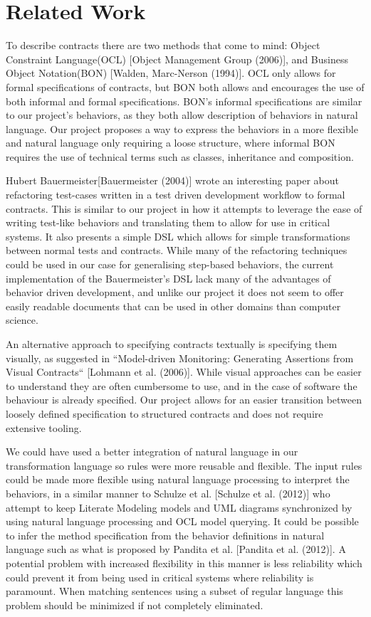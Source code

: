 \section{Related Work}
To describe contracts there are two methods that come to mind: Object Constraint Language(OCL) [Object Management Group (2006)], and Business Object Notation(BON) [Walden, Marc-Nerson (1994)].
OCL only allows for formal specifications of contracts, but BON both allows and encourages the use of both informal and formal specifications.
BON's informal specifications are similar to our project's behaviors, as they both allow description of behaviors in natural language.
Our project proposes a way to express the behaviors in a more flexible and natural language only requiring a loose structure, where informal BON requires the use of technical terms such as classes, inheritance and composition.



Hubert Bauermeister[Bauermeister (2004)] wrote an interesting paper about refactoring test-cases written in a test driven development workflow to formal contracts.
This is similar to our project in how it attempts to leverage the ease of writing test-like behaviors and translating them to allow for use in critical systems.
It also presents a simple DSL which allows for simple transformations between normal tests and contracts.
While many of the refactoring techniques could be used in our case for generalising step-based behaviors, the current implementation of the Bauermeister’s DSL lack many of the advantages of behavior driven development, and unlike our project it does not seem to offer easily readable documents that can be used in other domains than computer science.



An alternative approach to specifying contracts textually is specifying them visually, as suggested in “Model-driven Monitoring: Generating Assertions from Visual Contracts“ [Lohmann et al. (2006)]. While visual approaches can be easier to understand they are often cumbersome to use, and in the case of software the behaviour is already specified.
Our project allows for an easier transition between loosely defined specification to structured contracts and does not require extensive tooling.



We could have used a better integration of natural language in our transformation language so rules were more reusable and flexible. 
The input rules could be made more flexible using natural language processing to interpret the behaviors, in a similar manner to Schulze et al. [Schulze et al. (2012)] who attempt to keep Literate Modeling models and UML diagrams synchronized by using natural language processing and OCL model querying.
It could be possible to infer the method specification from the behavior definitions in natural language such as what is proposed by Pandita et al. [Pandita et al. (2012)].
A potential problem with increased flexibility in this manner is less reliability which could prevent it from being used in critical systems where reliability is paramount.
When matching sentences using a subset of regular language this problem should be minimized if not completely eliminated.